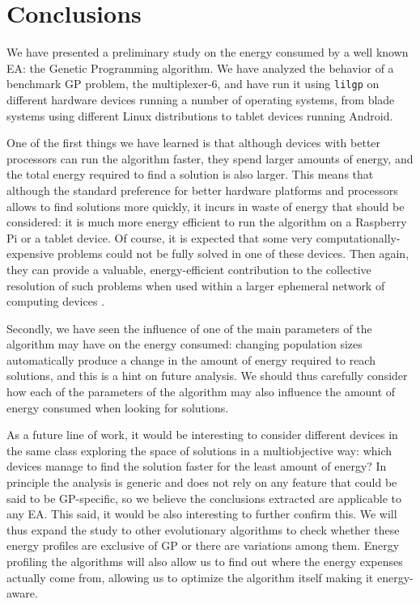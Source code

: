 \section{Conclusions}
\label{conclusions}

We have presented a preliminary study on the energy consumed by a well
known EA: the Genetic Programming algorithm. We 
have analyzed the behavior of a benchmark GP problem, the
multiplexer-6, and have run it using {\tt lilgp} on different
hardware devices running a number of operating systems, from blade
systems using different Linux distributions to tablet devices running
Android. 

One of the first things we have learned is that although devices with
better processors can run the algorithm faster, they spend
larger amounts of energy, and the total energy required to find a
solution is also larger.  This means that although the standard
preference for better hardware platforms and processors allows to find
solutions more quickly, it incurs in waste of energy that should be
considered:  it is much more energy efficient to run the algorithm on
a Raspberry Pi or a tablet device. Of course, it is expected that some very 
computationally-expensive problems could not be fully solved in one
of these devices. Then again, they can provide a valuable, energy-efficient
contribution to the collective resolution of such problems when used
within a larger ephemeral network of computing devices \cite{ephemeral2015}.

Secondly, we have seen the influence of one of the main parameters
of the algorithm may have on the energy consumed:  changing population
sizes automatically produce a change in the amount of energy required to reach
solutions, and this is a hint on future analysis.  We should thus carefully
consider how each of the parameters of the algorithm may also
influence the amount of energy consumed when looking for solutions. 

As a future line of work, it would be interesting to consider
different devices in the same class exploring the space of
solutions in a multiobjective way: which devices manage to find the
solution faster for the least amount of energy?  In principle the analysis
is generic and does not rely on any 
feature that could be said to be GP-specific, so we believe the conclusions
extracted are applicable to any EA.  This said, it would be also interesting to further confirm
this. We will thus expand the study
to other evolutionary algorithms to check whether these energy
profiles are exclusive of GP or there are variations
among them. Energy profiling the algorithms will also allow us to find
out where the energy expenses actually come from, allowing us to
optimize the algorithm itself making it energy-aware.
